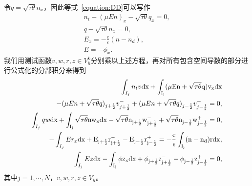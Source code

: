 令$q = \sqrt{\tau \theta }n_x$，因此等式~\eqref{equation:DD}可以写作
\begin{align}
    n_t - (\mu E n)_x - \sqrt{\tau \theta}q_x = 0, \\
    q - \sqrt{\tau \theta}n_x = 0,                 \\
    E_x = -\frac{e}{\epsilon}(n - n_d),            \\
    E = - \phi_x.
\end{align}
我们用测试函数$v,w,r,z \in V_h^k$分别乘以上述方程，再对所有包含空间导数的部分进行公式化的分部积分来得到
\begin{align}
    \int_{I_j} n_t v \rm{d}x + \int_{I_j}(\mu En + \sqrt{\tau \theta}q)v_x\rm{d} x          \nonumber                                                                                                             \\
    - (\mu En + \sqrt{\tau \theta}q)_{j+\frac{1}{2}}v_{j+\frac{1}{2}}^- +(\mu En + \sqrt{\tau \theta}q)_{j-\frac{1}{2}}v_{j-\frac{1}{2}}^+ = 0, \label{weakForm:1}                                                \\
    \int_{I_j} qw\rm{d}x + \int_{I_j}\sqrt{\tau \theta} n w_x \rm{d}x - \sqrt{\tau \theta} n_{j+\frac{1}{2}}w_{j+\frac{1}{2}}^- + \sqrt{\tau \theta} n_{j-\frac{1}{2}}w_{j-\frac{1}{2}}^+ = 0, \label{weakForm:2} \\
    -\int_{I_j}Er_x\rm{d}x + E_{j+\frac{1}{2}}r_{j+\frac{1}{2}}^- - E_{j-\frac{1}{2}}r_{j-\frac{1}{2}}^+ = -\frac{e}{\epsilon}\int_{I_j}(n-n_d)r\rm{d}x,                                       \label{weakForm:3} \\
    \int_{I_j} Ez \rm{d}x - \int_{I_j}\phi z_x \rm{d}x + \phi_{j+\frac{1}{2}}z_{j+\frac{1}{2}}^- - \phi_{j-\frac{1}{2}}z_{j-\frac{1}{2}}^+ = 0,\label{weakForm:4}
\end{align}
其中$ j=1,\cdots,N$，$v,w,r,z \in V_h$。
